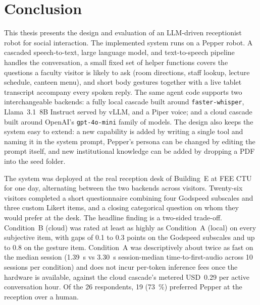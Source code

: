 \chapter{Conclusion}
\label{ch:conclusion}


This thesis presents the design and evaluation of an LLM-driven receptionist robot for social interaction.
The implemented system runs on a Pepper robot.
A cascaded speech-to-text, large language model, and text-to-speech pipeline handles the conversation, a small fixed set of helper functions covers the questions a faculty visitor is likely to ask (room directions, staff lookup, lecture schedule, canteen menu), and short body gestures together with a live tablet transcript accompany every spoken reply.
The same agent code supports two interchangeable backends: a fully local cascade built around \texttt{faster-whisper}, Llama~3.1~8B Instruct served by vLLM, and a Piper voice; and a cloud cascade built around OpenAI's \texttt{gpt-4o-mini} family of models.
The design also keeps the system easy to extend: a new capability is added by writing a single tool and naming it in the system prompt, Pepper's persona can be changed by editing the prompt itself, and new institutional knowledge can be added by dropping a PDF into the seed folder.

The system was deployed at the real reception desk of Building~E at FEE CTU for one day, alternating between the two backends across visitors.
Twenty-six visitors completed a short questionnaire combining four Godspeed subscales and three custom Likert items, and a closing categorical question on whom they would prefer at the desk.
The headline finding is a two-sided trade-off.
Condition~B (cloud) was rated at least as highly as Condition~A (local) on every subjective item, with gaps of 0.1 to 0.3 points on the Godspeed subscales and up to 0.8 on the gesture item.
Condition~A was descriptively about twice as fast on the median session (1.39~s vs 3.30~s session-median time-to-first-audio across 10 sessions per condition) and does not incur per-token inference fees once the hardware is available, against the cloud cascade's metered USD~0.29 per active conversation hour.
Of the 26 respondents, 19 (73~\%) preferred Pepper at the reception over a human.

